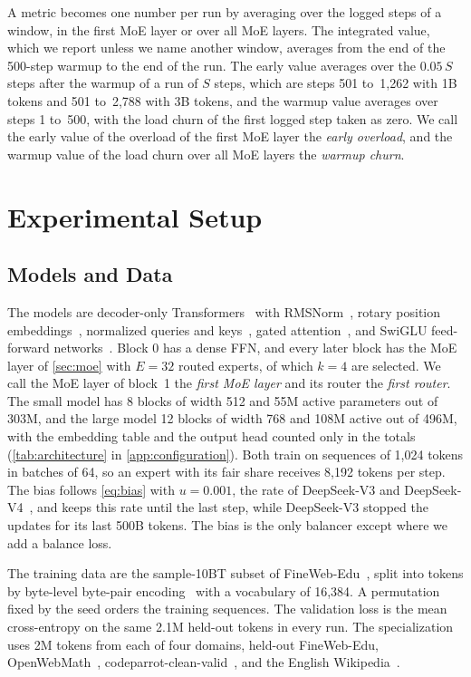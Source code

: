 \documentclass[11pt, a4paper]{article}
\begin{document}
A metric becomes one number per run by averaging over the logged steps of a window, in the first MoE layer or over all MoE layers. The integrated value, which we report unless we name another window, averages from the end of the 500-step warmup to the end of the run. The early value averages over the $0.05\, S$ steps after the warmup of a run of $S$ steps, which are steps 501 to~1,262 with 1B tokens and 501 to~2,788 with 3B tokens, and the warmup value averages over steps 1 to~500, with the load churn of the first logged step taken as zero. We call the early value of the overload of the first MoE layer the \emph{early overload}, and the warmup value of the load churn over all MoE layers the \emph{warmup churn}.

\section{Experimental Setup}
\label{sec:setup}

\subsection{Models and Data}
\label{sec:models}

The models are decoder-only Transformers~\citep{vaswani2017attention, radford2019language} with RMSNorm~\citep{zhang2019rmsnorm}, rotary position embeddings~\citep{su2024roformer}, normalized queries and keys~\citep{henry2020qknorm, dehghani2023vit22b}, gated attention~\citep{qiu2025gated}, and SwiGLU feed-forward networks~\citep{shazeer2020glu}. Block 0 has a dense FFN, and every later block has the MoE layer of \cref{sec:moe} with $E = 32$ routed experts, of which $k = 4$ are selected. We call the MoE layer of block~1 the \emph{first MoE layer} and its router the \emph{first router}. The small model has 8 blocks of width 512 and 55M active parameters out of 303M, and the large model 12 blocks of width 768 and 108M active out of 496M, with the embedding table and the output head counted only in the totals (\cref{tab:architecture} in \cref{app:configuration}). Both train on sequences of 1,024 tokens in batches of 64, so an expert with its fair share receives 8,192 tokens per step. The bias follows \cref{eq:bias} with $u = 0.001$, the rate of DeepSeek-V3 and DeepSeek-V4~\citep{deepseek2024v3, deepseek2026v4}, and keeps this rate until the last step, while DeepSeek-V3 stopped the updates for its last 500B tokens. The bias is the only balancer except where we add a balance loss.

The training data are the sample-10BT subset of FineWeb-Edu~\citep{penedo2024fineweb}, split into tokens by byte-level byte-pair encoding~\citep{sennrich2016bpe, radford2019language} with a vocabulary of 16,384. A permutation fixed by the seed orders the training sequences. The validation loss is the mean cross-entropy on the same 2.1M held-out tokens in every run. The specialization uses 2M tokens from each of four domains, held-out FineWeb-Edu, OpenWebMath~\citep{paster2024openwebmath}, codeparrot-clean-valid~\citep{codeparrot2022clean}, and the English Wikipedia~\citep{wikimedia2023wikipedia}.
\end{document}
